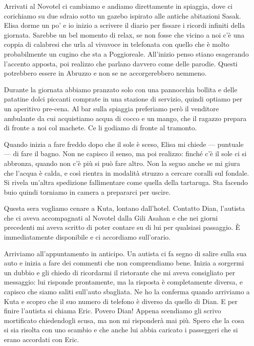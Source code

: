 Arrivati al Novotel ci cambiamo e andiamo direttamente in spiaggia, dove ci corichiamo su due sdraio sotto un gazebo ispirato alle antiche abitazioni Sasak. Elisa dorme un po' e io inizio a scrivere il diario per fissare i ricordi infiniti della giornata. Sarebbe un bel momento di relax, se non fosse che vicino a noi c'è una coppia di calabresi che urla al vivavoce in telefonata con quello che è molto probabilmente un cugino che sta a Poggioreale. All'inizio penso stiano esagerando l'accento apposta, poi realizzo che parlano davvero come delle parodie. Questi potrebbero essere in Abruzzo e non se ne accorgerebbero nemmeno.

Durante la giornata abbiamo pranzato solo con una pannocchia bollita e delle patatine dolci piccanti comprate in una stazione di servizio, quindi optiamo per un aperitivo pre-cena. Al bar sulla spiaggia preferiamo però il venditore ambulante da cui acquistiamo acqua di cocco e un mango, che il ragazzo prepara di fronte a noi col machete. Ce li godiamo di fronte al tramonto.

Quando inizia a fare freddo dopo che il sole è sceso, Elisa mi chiede — puntuale — di fare il bagno. Non ne capisco il senso, ma poi realizzo: finché c'è il sole ci si abbronza, quando non c'è più si può fare altro. Non la seguo anche se mi giura che l'acqua è calda, e così rientra in modalità struzzo a cercare coralli sul fondale. Si rivela un'altra spedizione fallimentare come quella della tartaruga. Sta facendo buio quindi torniamo in camera a prepararci per uscire.

Questa sera vogliamo cenare a Kuta, lontano dall'hotel. Contatto Dian, l'autista che ci aveva accompagnati al Novotel dalla Gili Asahan e che nei giorni precedenti mi aveva scritto di poter contare su di lui per qualsiasi passaggio. È immediatamente disponibile e ci accordiamo sull'orario.

Arriviamo all'appuntamento in anticipo. Un autista ci fa segno di salire sulla sua auto e inizia a fare dei commenti che non comprendiamo bene. Inizia a sorgermi un dubbio e gli chiedo di ricordarmi il ristorante che mi aveva consigliato per messaggio: lui risponde prontamente, ma la risposta è completamente diversa, e capisco che siamo saliti sull'auto sbagliata. Ne ho la conferma quando arriviamo a Kuta e scopro che il suo numero di telefono è diverso da quello di Dian. E per finire l'autista si chiama Eric. Povero Dian! Appena scendiamo gli scrivo mortificato chiedendogli scusa, ma non mi risponderà mai più. Spero che la cosa si sia risolta con uno scambio e che anche lui abbia caricato i passeggeri che si erano accordati con Eric.

